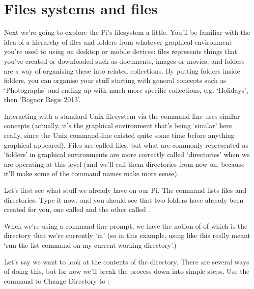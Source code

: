 \section{Files systems and files}

Next we're going to explore the Pi's filesystem a little. You'll be familiar with the idea of a hierarchy of files and folders from whatever graphical environment you're used to using on desktop or mobile devices: files represents things that you've created or downloaded such as documents, images or movies, and folders are a way of organising these into related collections. By putting folders inside folders, you can organise your stuff starting with general concepts such as `Photographs' and ending up with much more specific collections, e.g. `Holidays', then `Bognor Regis 2013'. 

Interacting with a standard Unix filesystem via the command-line uses similar concepts (actually, it's the graphical environment that's being `similar' here really, since the Unix command-line existed quite some time before anything graphical appeared). Files are called files, but what are commonly represented as `folders' in graphical environments are more correctly called `directories' when we are operating at this level (and we'll call them directories from now on, because it'll make some of the command names make more sense). 

Let's first see what stuff we already have on our Pi. The  command lists files and directories. Type it now, and you should see that two folders have already been created for you, one called  and the other called . 



When we're using a command-line prompt, we have the notion of of  which is the directory that we're currently `in' (so in this example, using  like this really meant `run the list command on my current working directory'.)

Let's say we want to look at the contents of the  directory. There are several ways of doing this, but for now we'll break the process down into simple steps. Use the  command to Change Directory to :

